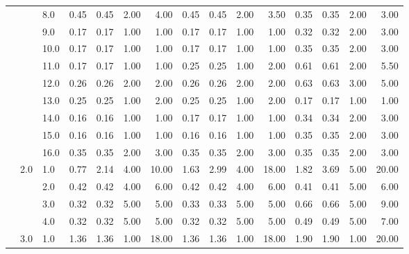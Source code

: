 \begin{tabular}{lllrrrrrrrrrrrr}
       &     & 8.0  &       0.45 &      0.45 & 2.00 &   4.00 &       0.45 &      0.45 &  2.00 &   3.50 &       0.35 &      0.35 &  2.00 &   3.00 \\
       &     & 9.0  &       0.17 &      0.17 & 1.00 &   1.00 &       0.17 &      0.17 &  1.00 &   1.00 &       0.32 &      0.32 &  2.00 &   3.00 \\
       &     & 10.0 &       0.17 &      0.17 & 1.00 &   1.00 &       0.17 &      0.17 &  1.00 &   1.00 &       0.35 &      0.35 &  2.00 &   3.00 \\
       &     & 11.0 &       0.17 &      0.17 & 1.00 &   1.00 &       0.25 &      0.25 &  1.00 &   2.00 &       0.61 &      0.61 &  2.00 &   5.50 \\
       &     & 12.0 &       0.26 &      0.26 & 2.00 &   2.00 &       0.26 &      0.26 &  2.00 &   2.00 &       0.63 &      0.63 &  3.00 &   5.00 \\
       &     & 13.0 &       0.25 &      0.25 & 1.00 &   2.00 &       0.25 &      0.25 &  1.00 &   2.00 &       0.17 &      0.17 &  1.00 &   1.00 \\
       &     & 14.0 &       0.16 &      0.16 & 1.00 &   1.00 &       0.17 &      0.17 &  1.00 &   1.00 &       0.34 &      0.34 &  2.00 &   3.00 \\
       &     & 15.0 &       0.16 &      0.16 & 1.00 &   1.00 &       0.16 &      0.16 &  1.00 &   1.00 &       0.35 &      0.35 &  2.00 &   3.00 \\
       &     & 16.0 &       0.35 &      0.35 & 2.00 &   3.00 &       0.35 &      0.35 &  2.00 &   3.00 &       0.35 &      0.35 &  2.00 &   3.00 \\
       & 2.0 & 1.0  &       0.77 &      2.14 & 4.00 &  10.00 &       1.63 &      2.99 &  4.00 &  18.00 &       1.82 &      3.69 &  5.00 &  20.00 \\
       &     & 2.0  &       0.42 &      0.42 & 4.00 &   6.00 &       0.42 &      0.42 &  4.00 &   6.00 &       0.41 &      0.41 &  5.00 &   6.00 \\
       &     & 3.0  &       0.32 &      0.32 & 5.00 &   5.00 &       0.33 &      0.33 &  5.00 &   5.00 &       0.66 &      0.66 &  5.00 &   9.00 \\
       &     & 4.0  &       0.32 &      0.32 & 5.00 &   5.00 &       0.32 &      0.32 &  5.00 &   5.00 &       0.49 &      0.49 &  5.00 &   7.00 \\
       & 3.0 & 1.0  &       1.36 &      1.36 & 1.00 &  18.00 &       1.36 &      1.36 &  1.00 &  18.00 &       1.90 &      1.90 &  1.00 &  20.00 \\

\end{tabular}
